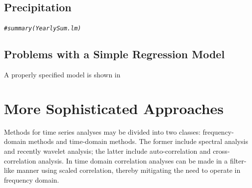 \documentclass{article}\usepackage[]{graphicx}\usepackage[]{color}
\makeatletter
\newcommand{\hlcom}[1]{\textcolor[rgb]{0.678,0.584,0.686}{\textit{#1}}}%
\newenvironment{kframe}{%
 \def\at@end@of@kframe{}%
 \ifinner\ifhmode%
  \def\at@end@of@kframe{\end{minipage}}%
  \begin{minipage}{\columnwidth}%
 \fi\fi%
 \def\FrameCommand##1{\hskip\@totalleftmargin \hskip-\fboxsep
 \colorbox{shadecolor}{##1}\hskip-\fboxsep
     \hskip-\linewidth \hskip-\@totalleftmargin \hskip\columnwidth}%
 \MakeFramed {\advance\hsize-\width
   \@totalleftmargin\z@ \linewidth\hsize
   \@setminipage}}%
 {\par\unskip\endMakeFramed%
 \at@end@of@kframe}
\newenvironment{knitrout}{}{} %
\makeatother
\begin{document}
\subsection{Precipitation}  


\begin{knitrout}
\color{fgcolor}\begin{kframe}
\begin{alltt}
\hlcom{#summary(YearlySum.lm)}
\end{alltt}
\end{kframe}
\end{knitrout}



\subsection{Problems with a Simple Regression Model}

A properly specified model is shown in 


\section{More Sophisticated Approaches}

Methods for time series analyses may be divided into two classes: frequency-domain methods and time-domain methods. The former include spectral analysis and recently wavelet analysis; the latter include auto-correlation and cross-correlation analysis. In time domain correlation analyses can be made in a filter-like manner using scaled correlation, thereby mitigating the need to operate in frequency domain.
\end{document}
